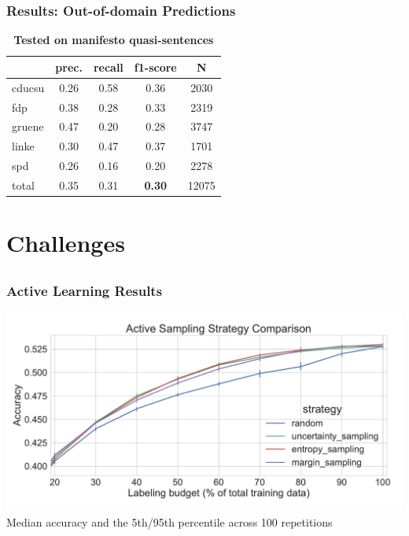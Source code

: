 \documentclass[]{beamer}
\begin{document}
\begin{frame}\frametitle{Results: Out-of-domain Predictions}

\begin{table}[t]
\caption{
\label{tab:results_out-of-domain}
{\bf Tested on manifesto quasi-sentences}}
\begin{center}
\begin{tabular}{lcccc}
    &         prec.    &recall &  f1-score  & N  \\
\hline \hline
    cducsu    &   0.26   &   0.58   &   0.36    &   2030 \\
    fdp    &   0.38   &   0.28   &   0.33    &   2319 \\
     gruene   &    0.47    &  0.20   &   0.28    &  3747\\
      linke     &  0.30  &    0.47    &  0.37    &   1701\\
        spd     &  0.26  &    0.16   &   0.20    &   2278\\
\hline
total    &   0.35  &    0.31  &    {\bf 0.30}   &   12075\\
%
\end{tabular}
\end{center}

\end{table}

\end{frame}

\section{Challenges}
\subsection{}

\begin{frame}\frametitle{Active Learning Results}
\begin{center}
\includegraphics[width=\textwidth]{images/active_learning_manifesto.pdf} \\
Median accuracy and the 5th/95th percentile across 100 repetitions \\
\end{center}

\end{frame}
\end{document}
